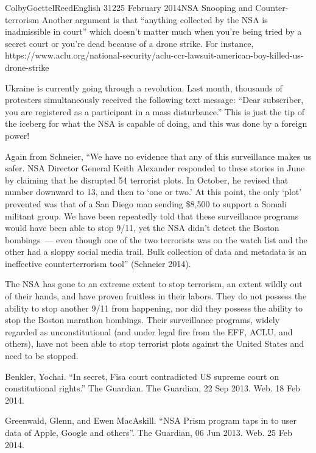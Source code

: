 \documentclass[12pt]{article}
\begin{document}
\begin{mla}{Colby}{Goettel}{Reed}{English 312}{25 February 2014}{NSA Snooping and Counter-terrorism}
Another argument is that ``anything collected by the NSA is inadmissible in court'' which doesn't matter much when you're being tried by a secret court or you're dead because of a drone strike. For instance, https://www.aclu.org/national-security/aclu-ccr-lawsuit-american-boy-killed-us-drone-strike

Ukraine is currently going through a revolution. Last month, thousands of protesters simultaneously received the following text message: ``Dear subscriber, you are registered as a participant in a mass disturbance.'' This is just the tip of the iceberg for what the NSA is capable of doing, and this was done by a foreign power!

Again from Schneier, ``We have no evidence that any of this surveillance makes us safer. NSA Director General Keith Alexander responded to these stories in June by claiming that he disrupted 54 terrorist plots. In October, he revised that number downward to 13, and then to `one or two.' At this point, the only `plot' prevented was that of a San Diego man sending \$8,500 to support a Somali militant group. We have been repeatedly told that these surveillance programs would have been able to stop 9/11, yet the NSA didn't detect the Boston bombings~--- even though one of the two terrorists was on the watch list and the other had a sloppy social media trail. Bulk collection of data and metadata is an ineffective counterterrorism tool'' (Schneier 2014).

The NSA has gone to an extreme extent to stop terrorism, an extent wildly out of their hands, and have proven fruitless in their labors. They do not possess the ability to stop another 9/11 from happening, nor did they possess the ability to stop the Boston marathon bombings. Their surveillance programs, widely regarded as unconstitutional (and under legal fire from the EFF, ACLU, and others), have not been able to stop terrorist plots against the United States and need to be stopped.

\begin{workscited}
    \bibent Benkler, Yochai. ``In secret, Fisa court contradicted US supreme court on constitutional rights.'' The Guardian. The Guardian, 22 Sep 2013. Web. 18 Feb 2014.
    
    \bibent Greenwald, Glenn, and Ewen MacAskill. ``NSA Prism program taps in to user data of Apple, Google and others''. The Guardian, 06 Jun 2013. Web. 25 Feb 2014.
    

\end{workscited}
\end{mla}
\end{document}
